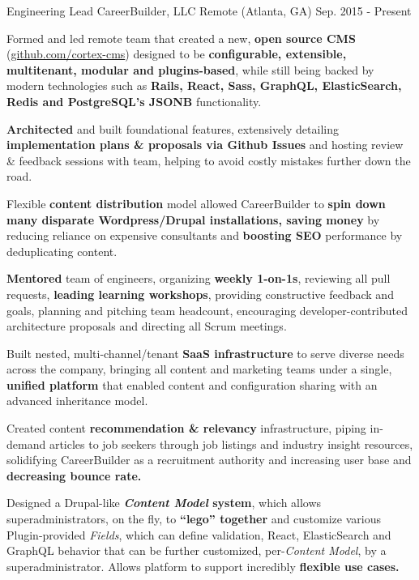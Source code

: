 \begin{cventries}
  \cventry
    {Engineering Lead}
    {CareerBuilder, LLC}
    {Remote (Atlanta, GA)}
    {Sep. 2015 - Present}
    {
      \begin{cvitems}
        \item {Formed and led remote team that created a new, \textbf{open source CMS} (\url{github.com/cortex-cms}) designed to be \textbf{configurable, extensible, multitenant, modular and plugins-based}, while still being backed by modern technologies such as \textbf{Rails, React, Sass, GraphQL, ElasticSearch, Redis and PostgreSQL's JSONB} functionality.}
        \item {\textbf{Architected} and built foundational features, extensively detailing \textbf{implementation plans \& proposals via Github Issues} and hosting review \& feedback sessions with team, helping to avoid costly mistakes further down the road.}
        \item {Flexible \textbf{content distribution} model allowed CareerBuilder to \textbf{spin down many disparate Wordpress/Drupal installations, saving money} by reducing reliance on expensive consultants and \textbf{boosting SEO} performance by deduplicating content.}
        \item {\textbf{Mentored} team of engineers, organizing \textbf{weekly 1-on-1s}, reviewing all pull requests, \textbf{leading learning workshops}, providing constructive feedback and goals, planning and pitching team headcount, encouraging developer-contributed architecture proposals and directing all Scrum meetings.}
        \item {Built nested, multi-channel/tenant \textbf{SaaS infrastructure }to serve diverse needs across the company, bringing all content and marketing teams under a single, \textbf{unified platform} that enabled content and configuration sharing with an advanced inheritance model.}
        \item {Created content \textbf{recommendation \& relevancy} infrastructure, piping in-demand articles to job seekers through job listings and industry insight resources, solidifying CareerBuilder as a recruitment authority and increasing user base and \textbf{decreasing bounce rate.}}
        \item {Designed a Drupal-like \textbf{\textit{Content Model} system}, which allows superadministrators, on the fly, to \textbf{“lego” together} and customize various Plugin-provided \textit{Fields}, which can define validation, React, ElasticSearch and GraphQL behavior that can be further customized, per-\textit{Content Model}, by a superadministrator. Allows platform to support incredibly \textbf{flexible use cases.}}

\end{cvitems}}
\end{cventries}
